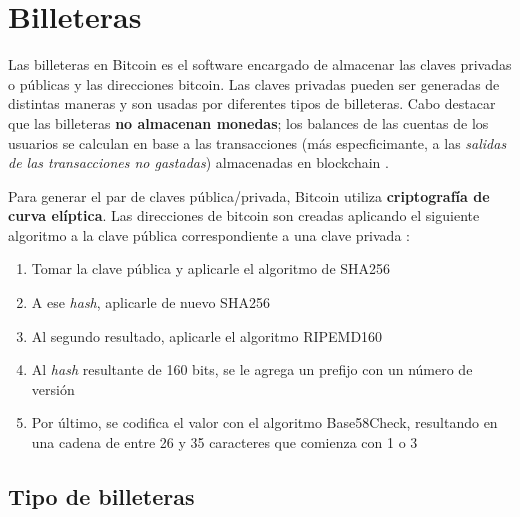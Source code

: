 \section{Billeteras}

Las billeteras en Bitcoin es el software encargado de almacenar las claves privadas o públicas y las direcciones bitcoin. Las claves privadas pueden ser generadas de distintas maneras y son usadas por diferentes tipos de billeteras. Cabo destacar que las billeteras \textbf{no almacenan monedas}; los balances de las cuentas de los usuarios se calculan en base a las transacciones (más especficimante, a las \emph{salidas de las transacciones no gastadas}) almacenadas en blockchain \autocite{MasteringBlockchainWallets}. 

Para generar el par de claves pública/privada, Bitcoin utiliza \textbf{criptografía de curva elíptica}. Las direcciones de bitcoin son creadas aplicando el siguiente algoritmo a la clave pública correspondiente a una clave privada \autocite{MasteringBlockchainKeys}:

\begin{enumerate}
    \item Tomar la clave pública y aplicarle el algoritmo de SHA256
    \item A ese \emph{hash}, aplicarle de nuevo SHA256 
    \item Al segundo resultado, aplicarle el algoritmo RIPEMD160
    \item Al \emph{hash} resultante de 160 bits, se le agrega un prefijo con un número de versión
    \item Por último, se codifica el valor con el algoritmo Base58Check, resultando en una cadena de entre 26 y 35 caracteres que comienza con 1 o 3
\end{enumerate}

\subsection{Tipo de billeteras}

